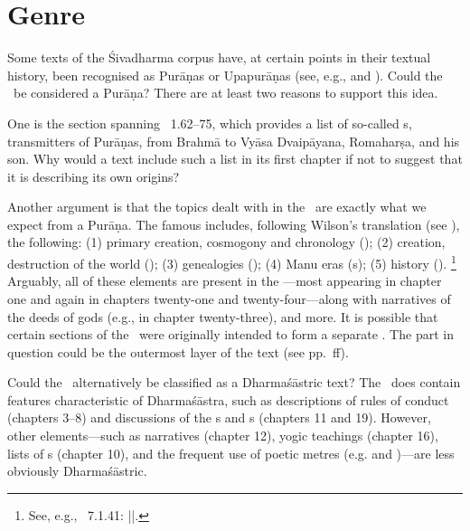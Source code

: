 \section{Genre}

Some texts of the Śivadharma corpus have, at certain points in their textual history,
been recognised as Purāṇas or Upapurāṇas (see, e.g.,  and \citeyear{HazraSDhU}).
Could the \VSS\ be considered a Purāṇa? There are at least two reasons to support this idea.

One is the section spanning \VSS\ 1.62--75, which provides a list of so-called s,
transmitters of Purāṇas, from Brahmā to Vyāsa Dvai\-pā\-yana, Romaharṣa, and his son.
Why would a text include such a list in its first chapter 
if not to suggest that it is describing its own origins?

Another argument is that the topics dealt with in the \VSS\ are exactly what
we expect from a Purāṇa. The famous  includes,
following Wilson's translation (see ), the following:
(1) primary creation, cosmogony and chronology (); 
(2) creation, destruction of the world ();
(3) genealogies (); 
(4) Manu eras (s);
(5) history ().%
		\footnote{See, e.g., \SIVP\ 7.1.41: 
                         ||.}
Arguably, all of these elements are present in the \VSS---most
appearing in chapter one and again in chapters twenty-one and
twenty-four---along with narratives of the deeds of gods
(e.g., in chapter twenty-three), and more. It is possible
that certain sections of the \VSS\ were originally intended
to form a separate . The part in question could
be the outermost layer of the text (see pp.~\pageref{structure}ff).



Could the \VSS\ alternatively be classified as a Dharmaśāstric text?
The \VSS\ does contain features characteristic of Dharmaśāstra,
such as descriptions of rules of conduct (chapters 3--8) and discussions of the 
s and s (chapters 11 and 19).
However, other elements---such as narratives (chapter 12),
yogic teachings (chapter 16), lists of s (chapter 10), 
and the frequent use of poetic metres (e.g.  and
)---are less obviously Dharmaśāstric.

